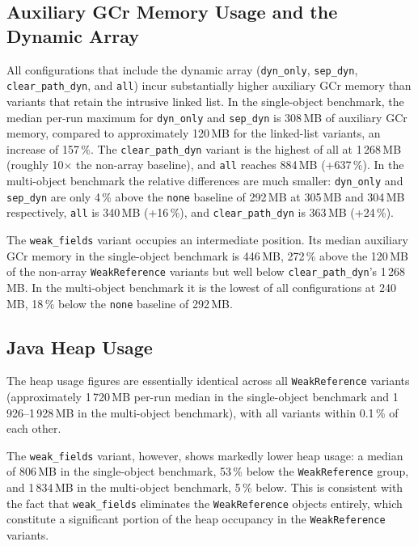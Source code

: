 \subsection{Auxiliary GCr Memory Usage and the Dynamic Array}
\label{subsec:analysis-memory-aux}

All configurations that include the dynamic array (\texttt{dyn\_only}, \texttt{sep\_dyn}, \texttt{clear\_path\_dyn}, and \texttt{all}) incur substantially higher auxiliary \ac{GCr} memory than variants that retain the intrusive linked list. In the single-object benchmark, the median per-run maximum for \texttt{dyn\_only} and \texttt{sep\_dyn} is 308\,MB of auxiliary \ac{GCr} memory, compared to approximately 120\,MB for the linked-list variants, an increase of 157\,\%. The \texttt{clear\_path\_dyn} variant is the highest of all at 1\,268\,MB (roughly 10$\times$ the non-array baseline), and \texttt{all} reaches 884\,MB (+637\,\%). In the multi-object benchmark the relative differences are much smaller: \texttt{dyn\_only} and \texttt{sep\_dyn} are only 4\,\% above the \texttt{none} baseline of 292\,MB at 305\,MB and 304\,MB respectively, \texttt{all} is 340\,MB (+16\,\%), and \texttt{clear\_path\_dyn} is 363\,MB (+24\,\%).

The \texttt{weak\_fields} variant occupies an intermediate position. Its median auxiliary \ac{GCr} memory in the single-object benchmark is 446\,MB, 272\,\% above the 120\,MB of the non-array \texttt{WeakReference} variants but well below \texttt{clear\_path\_dyn}'s 1\,268\,MB. In the multi-object benchmark it is the lowest of all configurations at 240\,MB, 18\,\% below the \texttt{none} baseline of 292\,MB.

\subsection{Java Heap Usage}
\label{subsec:analysis-memory-heap}

The heap usage figures are essentially identical across all \texttt{WeakReference} variants (approximately 1\,720\,MB per-run median in the single-object benchmark and 1\,926--1\,928\,MB in the multi-object benchmark), with all variants within 0.1\,\% of each other.

The \texttt{weak\_fields} variant, however, shows markedly lower heap usage: a median of 806\,MB in the single-object benchmark, 53\,\% below the \texttt{WeakReference} group, and 1\,834\,MB in the multi-object benchmark, 5\,\% below. This is consistent with the fact that \texttt{weak\_fields} eliminates the \texttt{WeakReference} objects entirely, which constitute a significant portion of the heap occupancy in the \texttt{WeakReference} variants.


